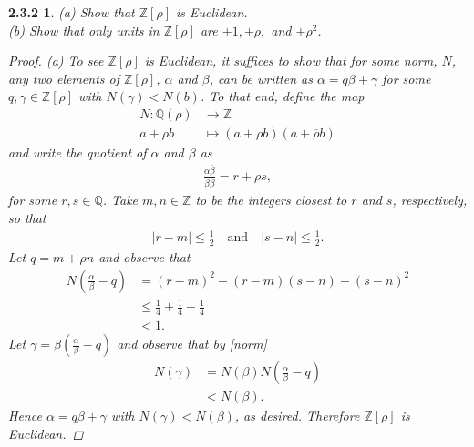 \documentclass[10pt]{amsart}
\begin{document}
\newtheorem*{3}{2.3.2}
\begin{3}
  (a) Show that \(\mathbb{Z}[\rho]\) is Euclidean.\\
  (b) Show that only units in \(\mathbb{Z}[\rho]\) are \(\pm 1, \pm \rho,\) and \(\pm \rho^2\).
  \begin{proof}
    (a) To see \(\mathbb{Z}[\rho]\) is Euclidean, it suffices to show that for some norm, \(N\), any two elements of \(\mathbb{Z}[\rho]\), \(\alpha\) and \(\beta\), can be written as \(\alpha = q\beta + \gamma\) for some \(q,\gamma \in \mathbb{Z}[\rho]\) with \(N(\gamma) < N(b)\).
  To that end, define the map
  \begin{align*}
      N: \mathbb{Q}(\rho) & \longrightarrow \mathbb{Z}\\ 
      a + \rho b & \longmapsto (a + \rho b)(a + \overline{\rho}b)
    \end{align*}
    and write the quotient of \(\alpha\) and \(\beta\) as
    \begin{align*}
      \frac{\alpha\overline{\beta}}{\beta\overline{\beta}} = r + {\rho}s,
    \end{align*}
    for some \(r,s \in \mathbb{Q}\).
    Take \(m,n \in \mathbb{Z}\) to be the integers closest to \(r\) and \(s\), respectively, so that
    \begin{align*}
      |r - m| \leq \frac{1}{2} \quad \text{and} \quad  |s - n| \leq \frac{1}{2}.
    \end{align*}
    Let \(q = m + {\rho}n\) and observe that
    \begin{equation}
      \label{norm}
      \begin{split}
        N(\frac{\alpha}{\beta} - q) &= (r - m)^2 - (r-m)(s-n) + (s-n)^2\\
        & \leq \frac{1}{4} + \frac{1}{4} + \frac{1}{4}\\
        & < 1.
      \end{split}
    \end{equation}
    Let \(\gamma = {\beta}(\frac{\alpha}{\beta} - q)\) and observe that by \eqref{norm}
    \begin{equation*}
      \begin{split}
        N(\gamma) &= N(\beta)N(\frac{\alpha}{\beta} - q)\\
        &< N(\beta).
      \end{split}
    \end{equation*}
    Hence \(\alpha = q\beta + \gamma\) with \(N(\gamma) < N(\beta)\), as desired.
    Therefore \(\mathbb{Z}[\rho]\) is Euclidean.


\end{proof}
\end{3}
\end{document}
